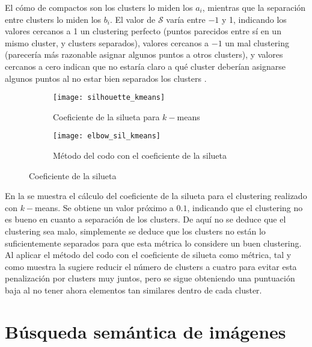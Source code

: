 					 El cómo de compactos son los clusters lo miden los $a_i$, mientras que la separación entre clusters lo miden los $b_i$. El valor de $\mathcal{S}$ varía entre $-1$ y 1, indicando los valores cercanos a 1 un clustering perfecto (puntos parecidos entre sí en un mismo cluster, y clusters separados), valores cercanos a $-1$ un mal clustering (parecería más razonable asignar algunos puntos a otros clusters), y valores cercanos a cero indican que no estaría claro a qué cluster deberían asignarse algunos puntos al no estar bien separados los clusters \cite{interpretacion_silhouette}. \\
					 
					 \begin{figure}[!h]
					 	\centering
					 	\begin{subfigure}{.45\textwidth}
					 		\centering
					 		\texttt{[image: silhouette\_kmeans]}
					 		\caption{Coeficiente de la silueta para $k-$means}
					 		\label{fig:silhouette_kmeans}
					 	\end{subfigure} 
					 	\begin{subfigure}{.45\textwidth}
					 		\centering
					 		\texttt{[image: elbow\_sil\_kmeans]}
					 		\caption{Método del codo con el coeficiente de la silueta}
					 		\label{fig:silhouette_elbow}
					 	\end{subfigure} 
					 	\caption{Coeficiente de la silueta}
					 	\label{fig:silhouette}
					 \end{figure}
					 
					 En la  se muestra el cálculo del coeficiente de la silueta para el clustering realizado con $k-$means. Se obtiene un valor próximo a $0.1$, indicando que el clustering no es bueno en cuanto a separación de los clusters. De aquí no se deduce que el clustering sea malo, simplemente se deduce que los clusters no están lo suficientemente separados para que esta métrica lo considere un buen clustering. Al aplicar el método del codo con el coeficiente de silueta como métrica, tal y como muestra la  sugiere reducir el número de clusters a cuatro para evitar esta penalización por clusters muy juntos, pero se sigue obteniendo una puntuación baja al no tener ahora elementos tan similares dentro de cada cluster. \\
					 
 	\section{Búsqueda semántica de imágenes}
	 	
